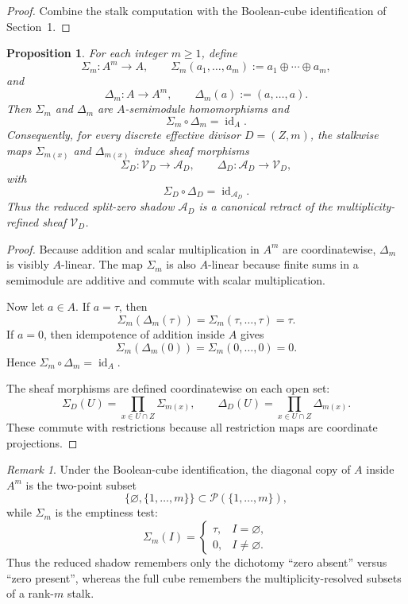 \documentclass[11pt,a4paper]{article}
\newtheorem{proposition}[theorem]{Proposition}
\theoremstyle{definition}
\theoremstyle{remark}
\newtheorem{remark}[theorem]{Remark}
\newcommand{\cP}{\mathcal P}
\begin{document}
\begin{proof}
Combine the stalk computation with the Boolean-cube identification of Section~1.
\end{proof}

\begin{proposition}
For each integer \(m\ge1\), define
\[
\Sigma_m:A^m\longrightarrow A,
\qquad
\Sigma_m(a_1,\dots,a_m):=a_1\oplus\cdots\oplus a_m,
\]
and
\[
\Delta_m:A\longrightarrow A^m,
\qquad
\Delta_m(a):=(a,\dots,a).
\]
Then \(\Sigma_m\) and \(\Delta_m\) are \(A\)-semimodule homomorphisms and
\[
\Sigma_m\circ\Delta_m=\operatorname{id}_A.
\]
Consequently, for every discrete effective divisor \(D=(Z,m)\), the stalkwise maps \(\Sigma_{m(x)}\) and \(\Delta_{m(x)}\) induce sheaf morphisms
\[
\Sigma_D:\mathcal V_D\longrightarrow \mathcal A_D,
\qquad
\Delta_D:\mathcal A_D\longrightarrow \mathcal V_D,
\]
with
\[
\Sigma_D\circ\Delta_D=\operatorname{id}_{\mathcal A_D}.
\]
Thus the reduced split-zero shadow \(\mathcal A_D\) is a canonical retract of the multiplicity-refined sheaf \(\mathcal V_D\).
\end{proposition}

\begin{proof}
Because addition and scalar multiplication in \(A^m\) are coordinatewise, \(\Delta_m\) is visibly \(A\)-linear. The map \(\Sigma_m\) is also \(A\)-linear because finite sums in a semimodule are additive and commute with scalar multiplication.

Now let \(a\in A\). If \(a=\tau\), then
\[
\Sigma_m(\Delta_m(\tau))=\Sigma_m(\tau,\dots,\tau)=\tau.
\]
If \(a=0\), then idempotence of addition inside \(A\) gives
\[
\Sigma_m(\Delta_m(0))=\Sigma_m(0,
\dots,0)=0.
\]
Hence \(\Sigma_m\circ\Delta_m=\operatorname{id}_A\).

The sheaf morphisms are defined coordinatewise on each open set:
\[
\Sigma_D(U)=\prod_{x\in U\cap Z}\Sigma_{m(x)},
\qquad
\Delta_D(U)=\prod_{x\in U\cap Z}\Delta_{m(x)}.
\]
These commute with restrictions because all restriction maps are coordinate projections.
\end{proof}

\begin{remark}
Under the Boolean-cube identification, the diagonal copy of \(A\) inside \(A^m\) is the two-point subset
\[
\{\varnothing,\{1,
\dots,m\}\}\subset \cP(\{1,
\dots,m\}),
\]
while \(\Sigma_m\) is the emptiness test:
\[
\Sigma_m(I)=
\begin{cases}
\tau,& I=\varnothing,\\
0,& I\ne\varnothing.
\end{cases}
\]
Thus the reduced shadow remembers only the dichotomy ``zero absent'' versus ``zero present'', whereas the full cube remembers the multiplicity-resolved subsets of a rank-\(m\) stalk.
\end{remark}
\end{document}
